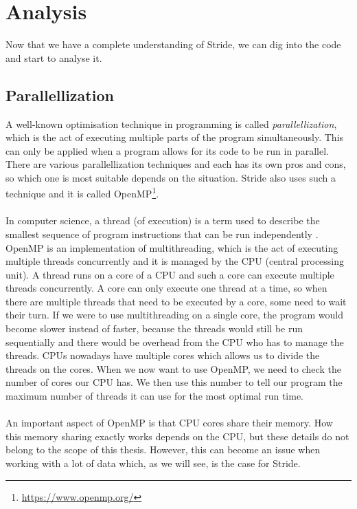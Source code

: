 \section{Analysis}
\label{sec:analysis}
Now that we have a complete understanding of Stride, we can dig into the code and start to analyse it. 

\subsection{Parallellization}
A well-known optimisation technique in programming is called \textit{parallellization}, which is the act of executing multiple parts of the program simultaneously. This can only be applied when a program allows for its code to be run in parallel. There are various parallellization techniques and each has its own pros and cons, so which one is most suitable depends on the situation. Stride also uses such a technique and it is called OpenMP\footnote{\url{https://www.openmp.org/}}.
\\\\
In computer science, a thread (of execution) is a term used to describe the smallest sequence of program instructions that can be run independently \cite{multiprocess_programs}. OpenMP is an implementation of multithreading, which is the act of executing multiple threads concurrently and it is managed by the CPU (central processing unit). A thread runs on a core of a CPU and such a core can execute multiple threads concurrently. A core can only execute one thread at a time, so when there are multiple threads that need to be executed by a core, some need to wait their turn. If we were to use multithreading on a single core, the program would become slower instead of faster, because the threads would still be run sequentially and there would be overhead from the CPU who has to manage the threads. CPUs nowadays have multiple cores which allows us to divide the threads on the cores. When we now want to use OpenMP, we need to check the number of cores our CPU has. We then use this number to tell our program the maximum number of threads it can use for the most optimal run time.
\\\\
An important aspect of OpenMP is that CPU cores share their memory. How this memory sharing exactly works depends on the CPU, but these details do not belong to the scope of this thesis. However, this can become an issue when working with a lot of data which, as we will see, is the case for Stride.

